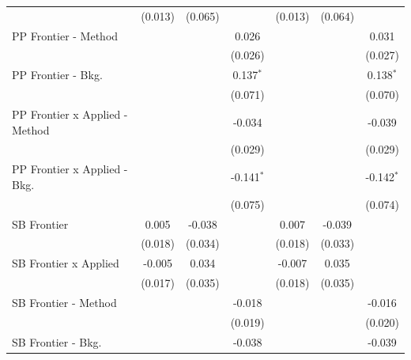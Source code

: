 \begin{tabular}{lcccccc}
                                  & (0.013)        & (0.065)       &               & (0.013)        & (0.064)       &   \\   
   PP Frontier - Method           &                &               & 0.026         &                &               & 0.031\\   
                                  &                &               & (0.026)       &                &               & (0.027)\\   
   PP Frontier - Bkg.             &                &               & 0.137$^{*}$   &                &               & 0.138$^{*}$\\   
                                  &                &               & (0.071)       &                &               & (0.070)\\   
   PP Frontier x Applied - Method &                &               & -0.034        &                &               & -0.039\\   
                                  &                &               & (0.029)       &                &               & (0.029)\\   
   PP Frontier x Applied - Bkg.   &                &               & -0.141$^{*}$  &                &               & -0.142$^{*}$\\   
                                  &                &               & (0.075)       &                &               & (0.074)\\   
   SB Frontier                    & 0.005          & -0.038        &               & 0.007          & -0.039        &   \\   
                                  & (0.018)        & (0.034)       &               & (0.018)        & (0.033)       &   \\   
   SB Frontier x Applied          & -0.005         & 0.034         &               & -0.007         & 0.035         &   \\   
                                  & (0.017)        & (0.035)       &               & (0.018)        & (0.035)       &   \\   
   SB Frontier - Method           &                &               & -0.018        &                &               & -0.016\\   
                                  &                &               & (0.019)       &                &               & (0.020)\\   
   SB Frontier - Bkg.             &                &               & -0.038        &                &               & -0.039\\   

\end{tabular}
